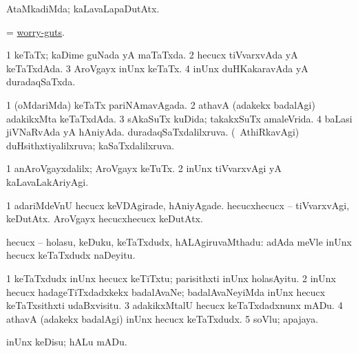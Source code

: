 \bentry
{} 
\gl{\kirxvi}
\expl{}
\bmng
AtaMkadiMda; kaLavaLapaDutAtx. 
\emng
\eentry

\bentry
{} 
\gl{\nA}
\expl{}
\bmng
= \hyperlink{worry-guts}{worry-guts}. 
\emng
\eentry

\bentry
{} 
\gl{\gu}
\expl{}
\bmng
\bnum
\num{1} keTaTx; kaDime guNada yA maTaTxda. 
\num{2} hecucx tiVvarxvAda yA keTaTxdAda. 
\num{3} AroVgayx inUnx keTaTx. 
\num{4} inUnx duHKakaravAda yA duradaqSaTxda. 
\enum
\emng

\noindent
\gl{\pagu}
\expl{}
\bmng
\bnum
\num{1}  (oMdariMda) keTaTx pariNAmavAgada. 
\num{2}  athavA (adakekx badalAgi) adakikxMta keTaTxdAda. 
\num{3}  sAkaSuTx kuDida; takakxSuTx amaleVrida. 
\num{4}  baLasi jiVNaRvAda yA hAniyAda. 
  
\banum
{} duradaqSaTxdalilxruva. 
 (\kanmu\ AthiRkavAgi) duHsithxtiyalilxruva; kaSaTxdalilxruva. 
\eanum
\numie
\enum
\emng
\eentry

\bentry
{} 
\gl{\kirxvi}
\expl{}
\bmng
\bnum
\num{1} anAroVgayxdalilx; AroVgayx keTuTx. 
\num{2} inUnx tiVvarxvAgi yA kaLavaLakAriyAgi. 
\enum
\emng

\noindent
\gl{\pagu}
\expl{}
\bmng
\bnum
\num{1}  adariMdeVnU hecucx keVDAgirade, hAniyAgade. 
  
\banum
{} hecucxhecucx -- tiVvarxvAgi, keDutAtx. 
 AroVgayx hecucxhecucx keDutAtx. 
\eanum
\numie
\enum
\emng
\eentry

\bentry
{} 
\gl{\nA}
\expl{}
\bmng
hecucx -- holasu, keDuku, keTaTxdudx, hALAgiruvaMthadu:  adAda meVle inUnx hecucx keTaTxdudx naDeyitu. 
\emng

\noindent
\gl{\pagu}
\expl{}
\bmng
\bnum
\num{1}  keTaTxdudx inUnx hecucx keTiTxtu; parisithxti inUnx holasAyitu. 
\num{2}  inUnx hecucx hadageTiTxdadxkekx badalAvaNe; badalAvaNeyiMda inUnx hecucx keTaTxsithxti udaBxvisitu. 
\num{3}  adakikxMtalU hecucx keTaTxdadxnunx mADu. 
\num{4}  athavA (adakekx badalAgi) inUnx hecucx keTaTxdudx. 
\num{5}  soVlu; apajaya. 
\enum
\emng
\eentry

\bentry
{} 
\gl{\sakirx}
\expl{}
\bmng
inUnx keDisu; hALu mADu. 
\emng

